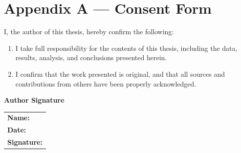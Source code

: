 \chapter*{Appendix A --- Consent Form}

I, the author of this thesis, hereby confirm the following:

\begin{enumerate}
    \item I take full responsibility for the contents of this thesis, including the data, results, analysis, and conclusions presented herein.
    \item I confirm that the work presented is original, and that all sources and contributions from others have been properly acknowledged.
\end{enumerate}

\vspace{2em}

\noindent
\textbf{Author Signature}

\vspace{2em}

\noindent
\begin{tabular}{@{}p{}}
\textbf{Name:} \hrulefill \\
\textbf{Date:} \hrulefill \\
\textbf{Signature:} \hrulefill \\
\end{tabular}
